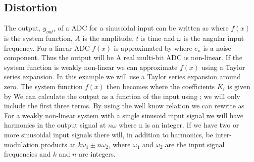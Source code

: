 \subsection{Distortion}
\label{sec:distortion}
The output, $y_{out}$, of a ADC for a sinusoidal input can
be written as 
where $f(x)$ is the system function, $A$ is the amplitude, $t$ is time and $\omega$ is
the angular input frequency.
For a linear ADC $f(x)$ is approximated by
where $e_n$ is a noise component. Thus the output will be 
A real multi-bit ADC is non-linear. If the
system function is weakly
non-linear we can approximate $f(x)$ using a Taylor series
expansion. In this example we will use a Taylor series expansion
around zero. The system function $f(x)$ then becomes
where the coefficients $K_i$ is given by
We can calculate the output as a function of the input using
; we will only include the first three terms. 
By using the well know relation
we can rewrite  as 
For a weakly non-linear system with a single
sinusoid input signal we will have harmonics in the output signal at $n
\omega$ where n is an integer. If we have two
or more sinusoidal input signals there will, in addition to harmonics, be inter-modulation
products at $k\omega_1 \pm n\omega_2$, where $\omega_1$ and $\omega_2$ are the
input signal frequencies and $k$ and $n$ are integers.

